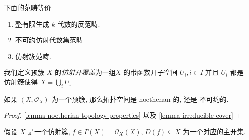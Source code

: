 \begin{corollary}
  下面的范畴等价
  \begin{enumerate}
    \item 整有限生成 \( k \)-代数的反范畴.
    \item 不可约仿射代数集范畴.
    \item 仿射簇范畴.
  \end{enumerate}
\end{corollary}

我们定义预簇 \( X \) 的\emph{仿射开覆盖}为一组\( X \) 的带函数开子空间 \( U_i, i
\in I\) 并且 \( U_i \) 都是仿射簇使得 \( X = \bigcup_i U_i \).

\begin{proposition}
  \label{proposition-prevariaties-properties}
  如果 \( (X, \mathscr{O}_X) \) 为一个预簇, 那么拓扑空间是 noetherian 的, 还是
  不可约的.
\end{proposition}
\begin{proof}
  \cref{lemma-noetherian-topology-properties} 以及
  \cref{lemma-irreducible-cover}.
\end{proof}


\begin{lemma}
  假设 \( X \) 是一个仿射簇, \( f \in \Gamma(X) = \mathscr{O}_X(X) \), \( D(f)
  \subseteq X \) 为一个对应的主开集.
\end{lemma}
